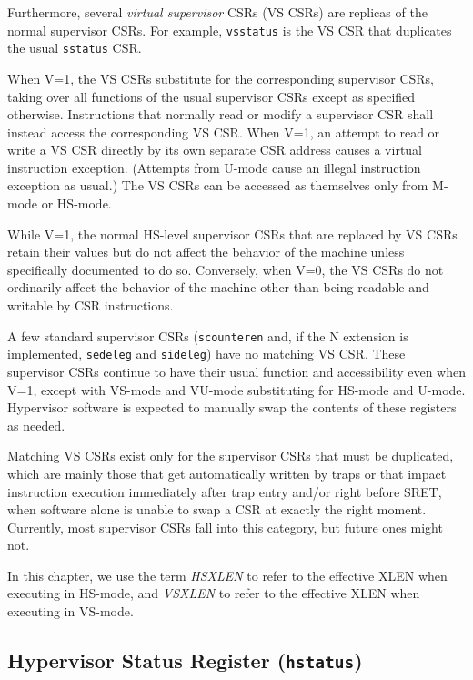 Furthermore, several {\em virtual supervisor} CSRs (VS CSRs) are replicas
of the normal supervisor CSRs.
For example, {\tt vsstatus} is the VS CSR that duplicates the usual
{\tt sstatus} CSR.

When V=1, the VS CSRs substitute for the corresponding supervisor CSRs,
taking over all functions of the usual supervisor CSRs except as specified
otherwise.
Instructions that normally read or modify a supervisor CSR shall instead
access the corresponding VS CSR.
When V=1, an attempt to read or write a VS CSR directly by its own
separate CSR address causes a virtual instruction exception.
(Attempts from U-mode cause an illegal instruction exception as usual.)
The VS CSRs can be accessed as themselves only from M-mode or HS-mode.

While V=1, the normal HS-level supervisor CSRs that are replaced by
VS CSRs retain their values but do
not affect the behavior of the machine unless specifically documented to
do so.
Conversely, when V=0, the VS CSRs do not ordinarily affect the behavior of
the machine other than being readable and writable by CSR instructions.

A few standard supervisor CSRs ({\tt scounteren} and, if the N extension
is implemented, {\tt sedeleg} and {\tt sideleg}) have no matching VS CSR.
These supervisor CSRs continue to have their usual function and
accessibility even when V=1, except with VS-mode and VU-mode substituting for
HS-mode and U-mode.
Hypervisor software is expected to manually swap the contents of these
registers as needed.

\begin{commentary}
Matching VS CSRs exist only for the supervisor CSRs that must be
duplicated, which are mainly those that get automatically written by
traps or that impact instruction execution immediately after trap entry
and/or right before SRET, when software alone is unable to swap a CSR at
exactly the right moment.
Currently, most supervisor CSRs fall into this category, but future ones
might not.
\end{commentary}

In this chapter, we use the term {\em HSXLEN} to refer to the effective XLEN
when executing in HS-mode, and {\em VSXLEN} to refer to the effective
XLEN when executing in VS-mode.

\subsection{Hypervisor Status Register ({\tt hstatus})}

